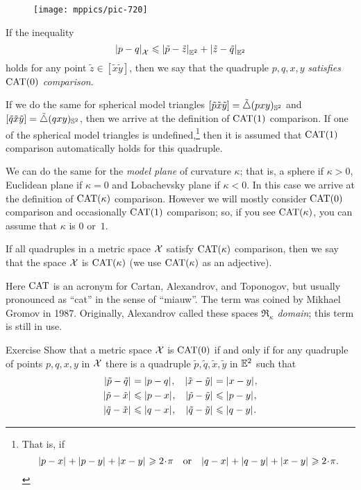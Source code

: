 \begin{wrapfigure}{r}{25mm}
\vskip-4mm
\centering
\texttt{[image: mppics/pic-720]}
\end{wrapfigure}

If the inequality
\[\dist{p}{q}{\spc{X}}\le \dist{\tilde p}{\tilde z}{\EE^2}+\dist{\tilde z}{\tilde q}{\EE^2}\]
holds for any point $\tilde z\in [\tilde x\tilde y]$, then we say that 
the quadruple $p,q,x,y$ \emph{satisfies $\mathrm{CAT}(0)$ comparison}.
\label{page:CAT-comparison}


If we do the same for spherical model triangles  
$[\tilde p\tilde x\tilde y]=\tilde\triangle{}(pxy)_{\mathbb{S}^2}$ 
and 
$[\tilde q\tilde x\tilde y]=\tilde\triangle{}(qxy)_{\mathbb{S}^2}$,
then we arrive at the definition of $\mathrm{CAT}(1)$ comparison.
If one of the spherical model triangles is undefined,\footnote{That is, if 
\[\dist{p}{x}{}+\dist{p}{y}{}+\dist{x}{y}{}\ge 2\cdot\pi
\quad
\text{or}
\quad
\dist{q}{x}{}+\dist{q}{y}{}+\dist{x}{y}{}\ge 2\cdot\pi.\]}
then it is assumed that $\mathrm{CAT}(1)$ comparison automatically holds for this quadruple.

We can do the same for the \emph{model plane} of curvature $\kappa$;
that is, a sphere if $\kappa>0$, 
Euclidean plane if $\kappa=0$ 
and Lobachevsky plane if $\kappa<0$.
In this case we arrive at the definition of $\mathrm{CAT}(\kappa)$ comparison.
However we will mostly consider $\mathrm{CAT}(0)$ comparison and occasionally $\mathrm{CAT}(1)$ comparison;
so, if you see $\mathrm{CAT}(\kappa)$, you can assume that $\kappa$ is $0$ or~$1$.

If all quadruples in a metric space $\mathcal{X}$ satisfy $\mathrm{CAT}(\kappa)$ comparison, then we say that the space $\mathcal{X}$ is $\mathrm{CAT}(\kappa)$
(we use $\mathrm{CAT}(\kappa)$ as an adjective).

Here $\mathrm{CAT}$ is an acronym for Cartan, Alexandrov, and Toponogov,
but usually pronounced as ``cat'' in the sense of ``miauw''.
The term was coined by Mikhael Gromov in 1987.
Originally, Alexandrov called these spaces \emph{$\mathfrak{R}_\kappa$ domain};
this term is still in use.

\begin{thm}{Exercise}\label{ex:sba-2+2-short}
Show that a metric space $\mathcal{X}$ is $\mathrm{CAT}(0)$
if and only if for any quadruple of points 
$p,q,x,y$ in $\mathcal{X}$ 
there is a quadruple $\tilde p,\tilde q,\tilde x,\tilde y$ in $\mathbb{E}^2$
such that 
\begin{align*}
\dist{\tilde p}{\tilde q}{}&=\dist{p}{q}{},
&
\dist{\tilde x}{\tilde y}{}&=\dist{x}{y}{},
\\
\dist{\tilde p}{\tilde x}{}&\le \dist{p}{x}{},
&
\dist{\tilde p}{\tilde y}{}&\le \dist{p}{y}{},
\\
\dist{\tilde q}{\tilde x}{}&\le \dist{q}{x}{},
&
\dist{\tilde q}{\tilde y}{}&\le \dist{q}{y}{}.
\end{align*}

\end{thm}

